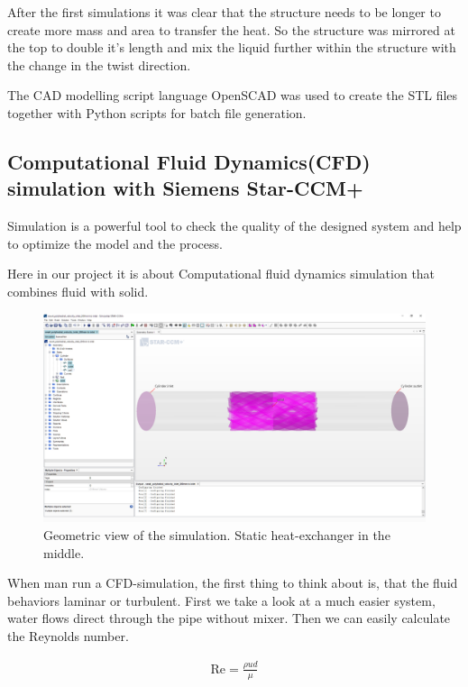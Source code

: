 \documentclass[journal,article,submit,moreauthors,pdftex]{Definitions/mdpi}
\begin{document}
After the first simulations it was clear that the structure needs to be longer to create more mass and area to transfer the heat. So the structure was mirrored at the top to double it's length and mix the liquid further within the structure with the change in the twist direction.

The CAD modelling script language OpenSCAD \cite{openscad} was used to create the STL files together with Python \cite{python} scripts for batch file generation.

\subsection{Computational Fluid Dynamics(CFD) simulation with Siemens Star-CCM+}
Simulation is a powerful tool to check the quality of the designed system and help to optimize the model and the process. 

Here in our project it is about Computational fluid dynamics simulation that combines fluid with solid. 

\begin{figure}
\begin{center}
\centerline{\includegraphics[width=\textwidth]{./docu_pictures/sketch1.png}}
\end{center}
\caption{Geometric view of the simulation. Static heat-exchanger in the middle.}
\label{simulation-sketch}
\end{figure}

When man run a CFD-simulation, the first thing to think about is, that the fluid behaviors laminar or turbulent. First we take a look at a much easier system, water flows direct through the pipe without mixer. Then we can easily calculate the Reynolds number. 

\begin{align*}
    \text{Re} = \frac{\rho ud}{\mu}
\end{align*}
\end{document}
